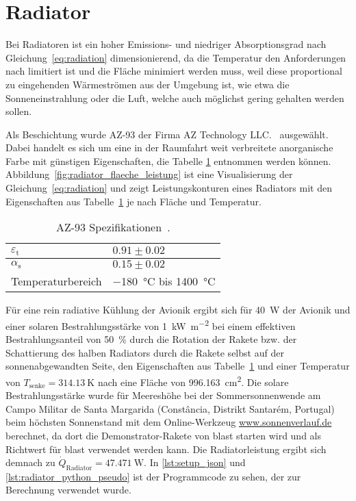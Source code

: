 \section{Radiator}\label{sec:Radiator}

Bei Radiatoren ist ein hoher Emissions- und niedriger Absorptionsgrad nach Gleichung~\ref{eq:radiation} dimensionierend, da die Temperatur den Anforderungen nach limitiert ist
und die Fläche minimiert werden muss, weil diese proportional zu eingehenden Wärmeströmen aus der Umgebung ist, wie etwa die Sonneneinstrahlung oder die Luft, welche auch möglichst gering gehalten werden sollen.

Als Beschichtung wurde AZ-93 der Firma AZ Technology LLC.~\cite{AZ-Technology} ausgewählt. Dabei handelt es sich um eine in der Raumfahrt
weit verbreitete anorganische Farbe mit günstigen Eigenschaften, die Tabelle \ref{tab:az-93_eigenschaften} entnommen werden können.
Abbildung~\ref{fig:radiator_flaeche_leistung} ist eine Visualisierung der Gleichung~\ref{eq:radiation} und zeigt Leistungskonturen eines
Radiators mit den Eigenschaften aus Tabelle~\ref{tab:az-93_eigenschaften} je nach Fläche und Temperatur.

\begin{table}

  \centering
  \caption{AZ-93 Spezifikationen~\cite{AZ-Technology}.}\label{tab:az-93_eigenschaften}

  \begin{tabular}{ll}

    \toprule[1pt]
    $\varepsilon_{\text{t}}$ & $0.91 \pm 0.02$ \\

    \midrule[0.5pt]
    $\alpha_{\text{s}}$ & $0.15 \pm 0.02$ \\

    \midrule[0.5pt]
    Temperaturbereich  & \SI{-180}{\degreeCelsius} bis \SI{1400}{\degreeCelsius} \\

    \bottomrule[1pt]
  \end{tabular}
\end{table}

Für eine rein radiative Kühlung der Avionik ergibt sich für \SI{40}{\watt} der Avionik und einer solaren Bestrahlungsstärke von \SI{1}{\kilo\watt\per\meter\squared}
bei einem effektiven Bestrahlungsanteil von \SI{50}{\percent} durch die Rotation der Rakete bzw. der Schattierung des halben Radiators durch die Rakete selbst auf der sonnenabgewandten Seite, den Eigenschaften aus
Tabelle~\ref{tab:az-93_eigenschaften} und einer Temperatur von $T_\mathrm{senke} = \SI{314,13}{\kelvin}$
nach eine Fläche von \SI{996,163}{\centi\meter\squared}.
Die solare Bestrahlungsstärke wurde für Meereshöhe bei der Sommersonnenwende am Campo Militar de Santa Margarida (Constância, Distrikt Santarém, Portugal) beim höchsten Sonnenstand
mit dem Online-Werkzeug \url{www.sonnenverlauf.de} berechnet, da dort die Demonstrator-Rakete von \ac{blast} starten wird und als Richtwert für \ac{blast} verwendet werden kann.
Die Radiatorleistung ergibt sich demnach zu $\dot{Q}_\mathrm{Radiator} = \SI{47,471}{\watt}$.
In \ref{lst:setup_json} und \ref{lst:radiator_python_pseudo} ist der Programmcode zu sehen, der zur Berechnung verwendet wurde.

